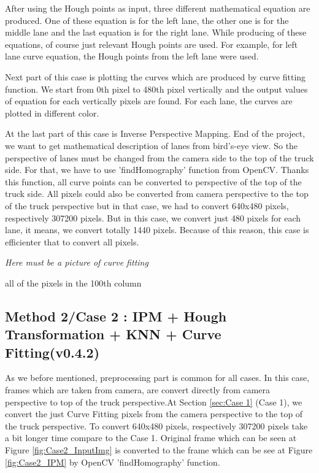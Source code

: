 After using the Hough points as input, three different mathematical equation are produced. One of these equation is for the left lane, the other one is for the middle lane and the last equation is for the right lane. While producing of these equations, of course just relevant Hough points are used. For example, for left lane curve equation, the Hough points from the left lane were used. 
 
Next part of this case is plotting the curves which are produced by curve fitting function. We start from 0th pixel to 480th pixel vertically and the output values of equation for each vertically pixels are found. For each lane, the curves are plotted in different color.  
 
At the last part of this case is Inverse Perspective Mapping. End of the project, we want to get mathematical description of lanes from bird's-eye view. So the perspective of lanes must be changed from the camera side to the top of the truck side. For that, we have to use 'findHomography' function from OpenCV. Thanks this function, all curve points can be converted to perspective of the top of the truck side. All pixels could also be converted from camera perspective to the top of the truck perspective but in that case, we had to convert 640x480 pixels, respectively 307200 pixels. But in this case, we convert just 480 pixels for each lane, it means, we convert totally 1440 pixels. Because of this reason, this case is efficienter that to convert all pixels.
 	 		 	


\emph{\color{blue} Here must be a picture of curve fitting}
 
all of the pixels in the 100th column

%

\subsection{Method 2/Case 2 : IPM + Hough Transformation + KNN + Curve Fitting(v0.4.2)}\label{sec:Case 2}

As we before mentioned, preprocessing part is common for all cases. In this case, frames which are taken from camera, are convert directly from camera perspective to top of the truck perspective.At Section \ref{sec:Case 1} (Case 1), we convert the just Curve Fitting pixels from the camera perspective to the top of the truck perspective. To convert 640x480 pixels, respectively 307200 pixels take a bit longer time compare to the Case 1. Original frame which can be seen at Figure \ref{fig:Case2_InputImg} is converted to the frame which can be see at Figure \ref{fig:Case2_IPM} by OpenCV 'findHomography' function.

